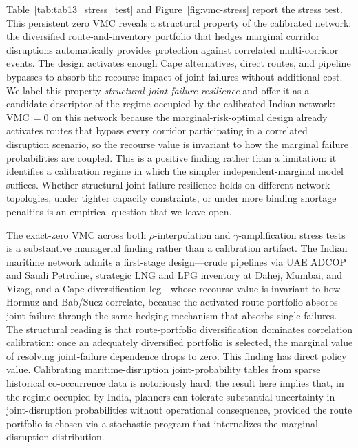 \documentclass[final,3p,authoryear]{elsarticle}
\theoremstyle{definition}
\begin{document}
Table~\ref{tab:tab13_stress_test} and Figure~\ref{fig:vmc-stress}
report the stress test. This persistent zero VMC reveals a structural
property of the calibrated network: the diversified route-and-inventory
portfolio that hedges marginal corridor disruptions automatically
provides protection against correlated multi-corridor events. The
design activates enough Cape alternatives, direct routes, and pipeline
bypasses to absorb the recourse impact of joint failures without
additional cost. We label this property \emph{structural joint-failure
resilience} and offer it as a candidate descriptor of the regime
occupied by the calibrated Indian network: VMC$\,=0$ on this network
because the marginal-risk-optimal design already activates routes that
bypass every corridor participating in a correlated disruption
scenario, so the recourse value is invariant to how the marginal
failure probabilities are coupled. This is a positive finding rather
than a limitation: it identifies a calibration regime in which the
simpler independent-marginal model suffices. Whether structural
joint-failure resilience holds on different network topologies, under
tighter capacity constraints, or under more binding shortage
penalties is an empirical question that we leave open.



The exact-zero VMC across both $\rho$-interpolation and $\gamma$-amplification stress tests is a substantive managerial finding rather than a calibration artifact. The Indian maritime network admits a first-stage design—crude pipelines via UAE ADCOP and Saudi Petroline, strategic LNG and LPG inventory at Dahej, Mumbai, and Vizag, and a Cape diversification leg—whose recourse value is invariant to how Hormuz and Bab/Suez correlate, because the activated route portfolio absorbs joint failure through the same hedging mechanism that absorbs single failures. The structural reading is that route-portfolio diversification dominates correlation calibration: once an adequately diversified portfolio is selected, the marginal value of resolving joint-failure dependence drops to zero. This finding has direct policy value. Calibrating maritime-disruption joint-probability tables from sparse historical co-occurrence data is notoriously hard; the result here implies that, in the regime occupied by India, planners can tolerate substantial uncertainty in joint-disruption probabilities without operational consequence, provided the route portfolio is chosen via a stochastic program that internalizes the marginal disruption distribution.
\end{document}
